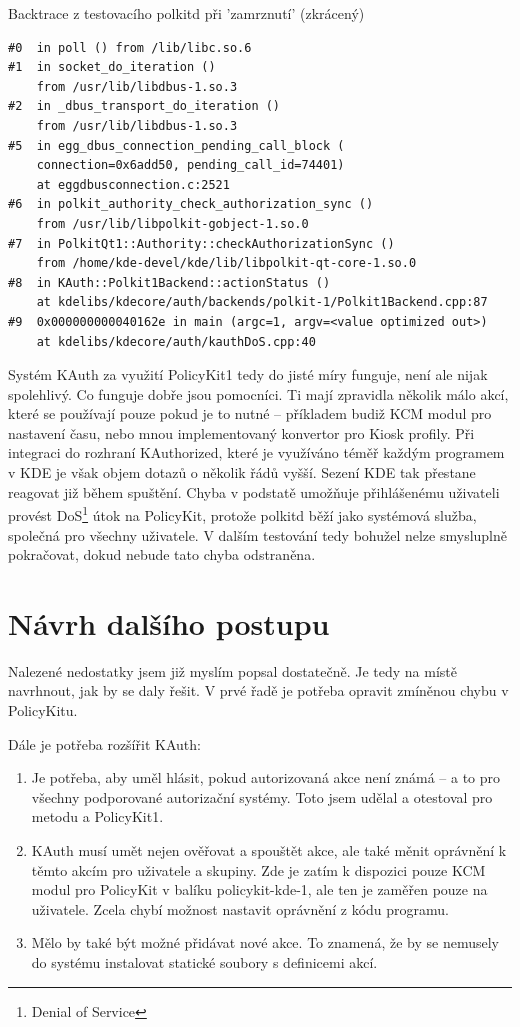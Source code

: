 {\begin{mylisting}
\caption{Backtrace z testovacího polkitd při 'zamrznutí' (zkrácený)}
\label{btrac2}
\begin{lstlisting}
#0  in poll () from /lib/libc.so.6
#1  in socket_do_iteration ()
    from /usr/lib/libdbus-1.so.3
#2  in _dbus_transport_do_iteration ()
    from /usr/lib/libdbus-1.so.3
#5  in egg_dbus_connection_pending_call_block (
    connection=0x6add50, pending_call_id=74401)
    at eggdbusconnection.c:2521
#6  in polkit_authority_check_authorization_sync ()
    from /usr/lib/libpolkit-gobject-1.so.0
#7  in PolkitQt1::Authority::checkAuthorizationSync ()
    from /home/kde-devel/kde/lib/libpolkit-qt-core-1.so.0
#8  in KAuth::Polkit1Backend::actionStatus ()
    at kdelibs/kdecore/auth/backends/polkit-1/Polkit1Backend.cpp:87
#9  0x000000000040162e in main (argc=1, argv=<value optimized out>)
    at kdelibs/kdecore/auth/kauthDoS.cpp:40 
\end{lstlisting}
\end{mylisting}
Systém KAuth za využití PolicyKit1 tedy do jisté míry funguje, není ale nijak spolehlivý. Co funguje dobře jsou pomocníci. Ti mají zpravidla několik málo akcí, které se používají pouze pokud je to nutné -- příkladem budiž KCM modul pro nastavení času, nebo mnou implementovaný konvertor pro Kiosk profily. Při integraci do rozhraní KAuthorized, které je využíváno téměř každým programem v KDE je však objem dotazů o několik řádů vyšší. Sezení KDE tak přestane reagovat již během spuštění. Chyba v podstatě umožňuje přihlášenému uživateli provést DoS\footnote{Denial of Service} útok na PolicyKit, protože polkitd běží jako systémová služba, společná pro všechny uživatele. V dalším testování tedy bohužel nelze smysluplně pokračovat, dokud nebude tato chyba odstraněna.

\section{Návrh dalšího postupu}
Nalezené nedostatky jsem již myslím popsal dostatečně. Je tedy na místě navrhnout, jak by se daly řešit. V prvé řadě je potřeba opravit zmíněnou chybu v PolicyKitu.

Dále je potřeba rozšířit KAuth:
\begin{enumerate}
\item Je potřeba, aby uměl hlásit, pokud autorizovaná akce není známá -- a to pro všechny podporované autorizační systémy. Toto jsem udělal a otestoval pro metodu  a PolicyKit1.
\item KAuth musí umět nejen ověřovat a spouštět akce, ale také měnit oprávnění k těmto akcím pro uživatele a skupiny. Zde je zatím k dispozici pouze KCM modul pro PolicyKit v balíku policykit-kde-1, ale ten je zaměřen pouze na uživatele. Zcela chybí možnost nastavit oprávnění z kódu programu.
\item Mělo by také být možné přidávat nové akce. To znamená, že by se nemusely do systému instalovat statické soubory s definicemi akcí.
\end{enumerate}

}
